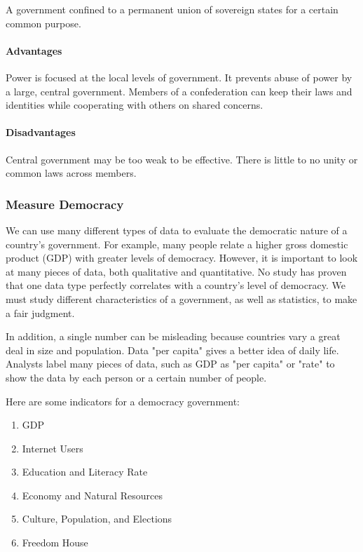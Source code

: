 \begin{definition}[Confederation]
  A government confined to a permanent union of sovereign states for a certain
  common purpose.

  \paragraph{Advantages} Power is focused at the local levels of government. It
  prevents abuse of power by a large, central government. Members of a
  confederation can keep their laws and identities while cooperating with others
  on shared concerns.

  \paragraph{Disadvantages} Central government may be too weak to be effective.
  There is little to no unity or common laws across members.
\end{definition}

\subsubsection{Measure Democracy}

We can use many different types of data to evaluate the democratic nature of a
country's government. For example, many people relate a higher gross domestic
product (GDP) with greater levels of democracy. However, it is important to look
at many pieces of data, both qualitative and quantitative. No study has proven
that one data type perfectly correlates with a country's level of democracy. We
must study different characteristics of a government, as well as statistics, to
make a fair judgment.

In addition, a single number can be misleading because countries vary a great
deal in size and population. Data "per capita" gives a better idea of daily
life. Analysts label many pieces of data, such as GDP as "per capita" or "rate"
to show the data by each person or a certain number of people.

Here are some indicators for a democracy government:

\begin{enumerate}
  \item GDP \\
  \item Internet Users \\
  \item Education and Literacy Rate \\
  \item Economy and Natural Resources \\
  \item Culture, Population, and Elections \\
  \item Freedom House \\
\end{enumerate}

